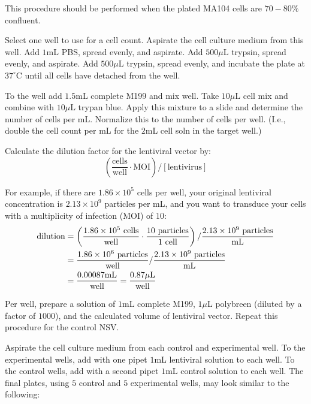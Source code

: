 This procedure should be performed when the plated MA104 cells are $70-80\%$ confluent.

Select one well to use for a cell count. Aspirate the cell culture medium from this well. Add $1$mL PBS, spread evenly, and aspirate. Add $500\mu$L trypsin, spread evenly, and aspirate. Add $500\mu$L trypsin, spread evenly, and incubate the plate at $37^{\circ}$C until all cells have detached from the well.

To the well add $1.5$mL complete M199 and mix well. Take $10\mu$L cell mix and combine with $10\mu$L trypan blue. Apply this mixture to a slide and determine the number of cells per mL. Normalize this to the number of cells per well. (I.e., double the cell count per mL for the $2$mL cell soln in the target well.)

Calculate the dilution factor for the lentiviral vector by:
\begin{equation*}
\left(\frac{\text{cells}}{\text{well}}\cdot \text{MOI}\right)/\left[\text{lentivirus}\right]
\end{equation*}

For example, if there are $1.86\times 10^5$ cells per well, your original lentiviral concentration is $2.13\times 10^9$ particles per mL, and you want to transduce your cells with a multiplicity of infection (MOI) of $10$:
\begin{align*}
\text{dilution} &= \left(\frac{1.86\times 10^{5}\text{ cells}}{\text{well}}\cdot \frac{10\text{ particles}}{1\text{ cell}}\right)/\frac{2.13\times 10^{9}\text{ particles}}{\text{mL}} \\
&= \frac{1.86\times 10^{6}\text{ particles}}{\text{well}}/\frac{2.13\times 10^{9}\text{ particles}}{\text{mL}} \\
&= \frac{0.00087\text{mL}}{\text{well}} = \frac{0.87\mu\text{L}}{\text{well}}
\end{align*}

Per well, prepare a solution of $1$mL complete M199, $1\mu$L polybreen (diluted by a factor of $1000$), and the calculated volume of lentiviral vector. Repeat this procedure for the control NSV.

Aspirate the cell culture medium from each control and experimental well. To the experimental wells, add with one pipet $1$mL lentiviral solution to each well. To the control wells, add with a second pipet $1$mL control solution to each well. The final plates, using $5$ control and $5$ experimental wells, may look similar to the following:

